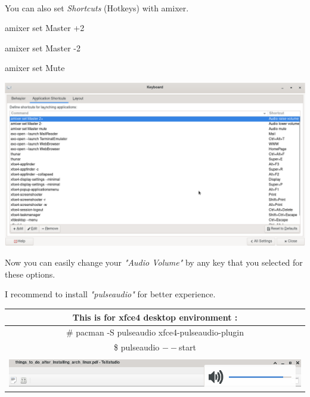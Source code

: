 \documentclass[12pt, a4paper]{article}
\begin{document}
\paragraph{}
You can also set \emph{Shortcuts} (Hotkeys) with amixer.
\par amixer set Master +2
\par amixer set Master -2
\par amixer set Mute 

\begin{center}
	\includegraphics[scale=0.3]{amixer.png}
\end{center}

\begin{large}
\par Now you can easily change your \emph{"Audio Volume"} by any key that you selected for these options.\\
\par I recommend to install \emph{"pulseaudio"} for better experience.\\
\end{large}

\begin{center}
	\begin{tabular}{|c|}\hline
		This is for xfce4 desktop environment :\\ \hline
		\# pacman -S pulseaudio xfce4-pulseaudio-plugin\\ \hline
		\$ pulseaudio $--$start\\
		\hline \\
		\includegraphics[scale=0.5]{pulseaudio.png}\\
		\hline
	\end{tabular}
\end{center}
\end{document}
